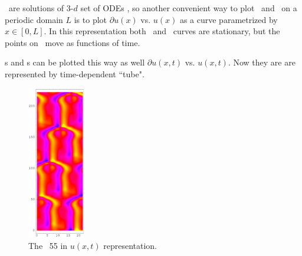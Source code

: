 \Eqv\ are solutions of 3-$d$ set of ODEs  , so
another convenient way to plot \eqva\ and \reqva\ on a periodic
domain $L$ is to plot 
$\partial u(x)$ vs. $u(x)$ as a curve parametrized by
$x\in [0,L]$. In this representation both \eqva\ and \reqva\ curves are
stationary, but the points on \reqva\ move as functions of time.

\Po s and \Rpo s can be plotted this way as well
$\partial u(x,t)$ vs. $u(x,t)$. Now they are are represented by time-dependent
``tube".



\begin{figure}[t] %
\centering
 	\includegraphics[width=2.5cm]{figs/rpo22-55-4-u.eps}
\hspace{0.1in}
\caption{
 The \rpo\ {\nameit}55 in $u(x,t)$ representation. 
        }
\label{f:rpo55u}
\end{figure}


